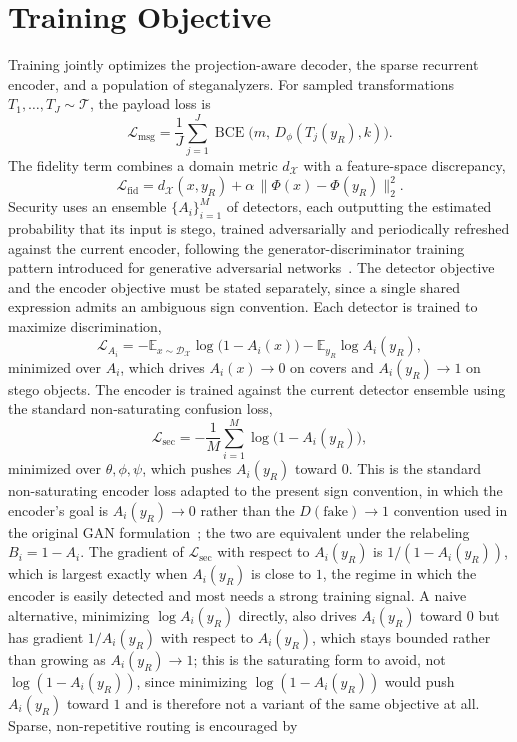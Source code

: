 \documentclass[11pt]{article}
\begin{document}
\section{Training Objective}

Training jointly optimizes the projection-aware decoder, the sparse recurrent encoder, and a population of steganalyzers. For sampled transformations $T_1,\dots,T_J \sim \mathcal{T}$, the payload loss is
\[
\mathcal{L}_{\mathrm{msg}} = \frac{1}{J}\sum_{j=1}^{J} \operatorname{BCE}\bigl(m,\, D_\phi(T_j(y_R),k)\bigr).
\]
The fidelity term combines a domain metric $d_\mathcal{X}$ with a feature-space discrepancy,
\[
\mathcal{L}_{\mathrm{fid}} = d_\mathcal{X}(x,y_R) + \alpha\,\|\Phi(x)-\Phi(y_R)\|_2^2.
\]
Security uses an ensemble $\{A_i\}_{i=1}^M$ of detectors, each outputting the estimated probability that its input is stego, trained adversarially and periodically refreshed against the current encoder, following the generator-discriminator training pattern introduced for generative adversarial networks~\cite{goodfellow2014}. The detector objective and the encoder objective must be stated separately, since a single shared expression admits an ambiguous sign convention. Each detector is trained to maximize discrimination,
\[
\mathcal{L}_{A_i} = -\mathbb{E}_{x\sim\mathcal{D}_\mathcal{X}}\log\bigl(1-A_i(x)\bigr) - \mathbb{E}_{y_R}\log A_i(y_R),
\]
minimized over $A_i$, which drives $A_i(x)\to 0$ on covers and $A_i(y_R)\to 1$ on stego objects. The encoder is trained against the current detector ensemble using the standard non-saturating confusion loss,
\[
\mathcal{L}_{\mathrm{sec}} = -\frac{1}{M}\sum_{i=1}^{M} \log\bigl(1-A_i(y_R)\bigr),
\]
minimized over $\theta,\phi,\psi$, which pushes $A_i(y_R)$ toward $0$. This is the standard non-saturating encoder loss adapted to the present sign convention, in which the encoder's goal is $A_i(y_R)\to 0$ rather than the $D(\text{fake})\to 1$ convention used in the original GAN formulation~\cite{goodfellow2014}; the two are equivalent under the relabeling $B_i = 1-A_i$. The gradient of $\mathcal{L}_{\mathrm{sec}}$ with respect to $A_i(y_R)$ is $1/(1-A_i(y_R))$, which is largest exactly when $A_i(y_R)$ is close to $1$, the regime in which the encoder is easily detected and most needs a strong training signal. A naive alternative, minimizing $\log A_i(y_R)$ directly, also drives $A_i(y_R)$ toward $0$ but has gradient $1/A_i(y_R)$ with respect to $A_i(y_R)$, which stays bounded rather than growing as $A_i(y_R) \to 1$; this is the saturating form to avoid, not $\log(1-A_i(y_R))$, since minimizing $\log(1-A_i(y_R))$ would push $A_i(y_R)$ toward $1$ and is therefore not a variant of the same objective at all. Sparse, non-repetitive routing is encouraged by
\end{document}

